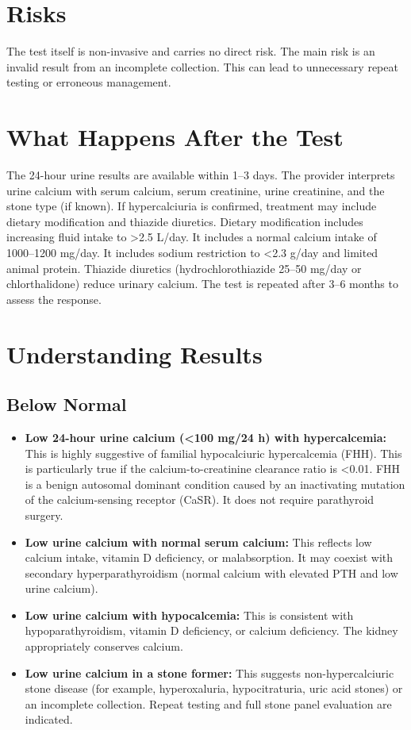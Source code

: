\section*{Risks}
The test itself is non-invasive and carries no direct risk. The main risk is an invalid result from an incomplete collection. This can lead to unnecessary repeat testing or erroneous management.

\section*{What Happens After the Test}
The 24-hour urine results are available within 1--3 days. The provider interprets urine calcium with serum calcium, serum creatinine, urine creatinine, and the stone type (if known). If hypercalciuria is confirmed, treatment may include dietary modification and thiazide diuretics. Dietary modification includes increasing fluid intake to >2.5 L/day. It includes a normal calcium intake of 1000--1200 mg/day. It includes sodium restriction to <2.3 g/day and limited animal protein. Thiazide diuretics (hydrochlorothiazide 25--50 mg/day or chlorthalidone) reduce urinary calcium. The test is repeated after 3--6 months to assess the response.

\section*{Understanding Results}

\subsection*{Below Normal}
\begin{itemize}
  \item \textbf{Low 24-hour urine calcium (<100 mg/24 h) with hypercalcemia:} This is highly suggestive of familial hypocalciuric hypercalcemia (FHH). This is particularly true if the calcium-to-creatinine clearance ratio is <0.01. FHH is a benign autosomal dominant condition caused by an inactivating mutation of the calcium-sensing receptor (CaSR). It does not require parathyroid surgery.
  \item \textbf{Low urine calcium with normal serum calcium:} This reflects low calcium intake, vitamin D deficiency, or malabsorption. It may coexist with secondary hyperparathyroidism (normal calcium with elevated PTH and low urine calcium).
  \item \textbf{Low urine calcium with hypocalcemia:} This is consistent with hypoparathyroidism, vitamin D deficiency, or calcium deficiency. The kidney appropriately conserves calcium.
  \item \textbf{Low urine calcium in a stone former:} This suggests non-hypercalciuric stone disease (for example, hyperoxaluria, hypocitraturia, uric acid stones) or an incomplete collection. Repeat testing and full stone panel evaluation are indicated.
\end{itemize}

